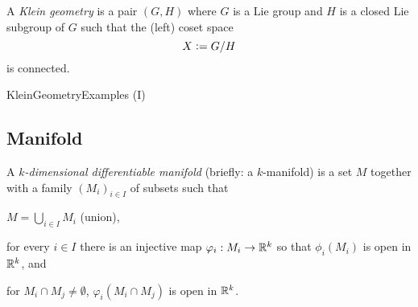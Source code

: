 \documentclass[../main.tex]{subfiles}
\begin{document}
\begin{definition}\label{KleinGeometry}
    A \textit{Klein geometry} is a pair $\left(G, H\right)$
    where $G$ is a Lie group
    and $H$ is a closed Lie subgroup of $G$
    such that the (left) coset space $$X\vcentcolon= G / H$$ is connected.
\end{definition}
\begin{example}\label{KleinGeometryExample}
    KleinGeometryExamples (I)
\end{example}

\subsection{Manifold}

\begin{definition}\label{Manifold}
    A \textit{$k$-dimensional differentiable manifold} (briefly: a $k$-manifold)
    is a set $M$ together with a family $\left(M_i\right)_{i\in I}$ of subsets such that
    \begin{APAenumerate}
        \item $M=\bigcup_{i\in I} M_i$ (union),
        \item for every $i\in I$ there is an injective map $\varphi_i:M_i\to\mathbb{R}^k$ so that $\phi_i\left(M_i\right)$ is open in $\mathbb{R}^k$, and
        \item for $M_i\cap M_j\ne\emptyset$, $\varphi_i\left(M_i\cap M_j\right)$ is open in $\mathbb{R}^k$.
    \end{APAenumerate}
\end{definition}
\end{document}
